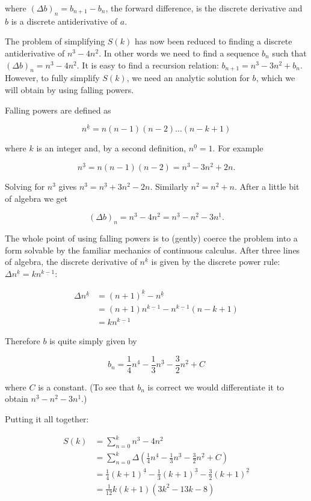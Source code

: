 \documentclass{article}
\begin{document}
\noindent where $(\Delta b)_n = b_{n+1} - b_n$, the forward difference, is the
discrete derivative and $b$ is a discrete antiderivative of $a$.

The problem of simplifying $S(k)$ has now been reduced to finding a discrete
antiderivative of $n^3-4n^2$. In other words we need to find a sequence $b_n$
such that $(\Delta b)_n = n^3-4n^2$. It is easy to find a recursion relation:
$b_{n+1} = n^3-3n^2 + b_n$. However, to fully simplify $S(k)$, we need an
analytic solution for $b$, which we will obtain by using falling powers.

Falling powers are defined as

\[
    n^{\underline{k}} = n(n-1)(n-2)\ldots(n-k+1)
\]

\noindent where $k$ is an integer and, by a second definition,
$n^{\underline{0}}=1$. For example

\[
    n^{\underline{3}} = n(n-1)(n-2) = n^3-3n^2+2n.
\]

\noindent Solving for $n^3$ gives $n^3 = n^{\underline{3}} + 3n^2-2n$.
Similarly $n^2 = n^{\underline{2}} + n$. After a little bit of algebra we get

\[
(\Delta b)_n=n^3-4n^2=n^{\underline{3}}-n^{\underline{2}}-3n^{\underline{1}}.
\]

The whole point of using falling powers is to (gently) coerce the problem into
a form solvable by the familiar mechanics of continuous calculus.  After three
lines of algebra, the discrete derivative of $n^{\underline{k}}$ is given by
the discrete power rule: $\Delta n^{\underline{k}}= kn^{\underline{k-1}}$:

\begin{align*}
\Delta n^{\underline{k}} &= (n+1)^{\underline{k}} - n^{\underline{k}} \\
             &= (n+1)n^{\underline{k-1}} - n^{\underline{k-1}}(n-k+1) \\
             &= kn^{\underline{k-1}}
\end{align*}

\noindent Therefore $b$ is quite simply given by

\[
b_n=\frac{1}{4}n^{\underline{4}}-\frac{1}{3}n^{\underline{3}}-\frac{3}{2}n^{\underline{2}}+C
\]

\noindent where $C$ is a constant. (To see that $b_n$ is correct we would
differentiate it to obtain
$n^{\underline{3}}-n^{\underline{2}}-3n^{\underline{1}}.$)

Putting it all together:

\begin{align*}
    S(k) &= \sum\limits_{n=0}^k n^3-4n^2 \\
         &= \sum\limits_{n=0}^k \Delta (\frac{1}{4}n^{\underline{4}}-\frac{1}{3}n^{\underline{3}}-\frac{3}{2}n^{\underline{2}}+C) \\
         &= \frac{1}{4}(k+1)^{\underline{4}}-\frac{1}{3}(k+1)^{\underline{3}}-\frac{3}{2}(k+1)^{\underline{2}} \\
         &= \frac{1}{12}k(k+1)(3k^2-13k-8)
\end{align*}
\end{document}
